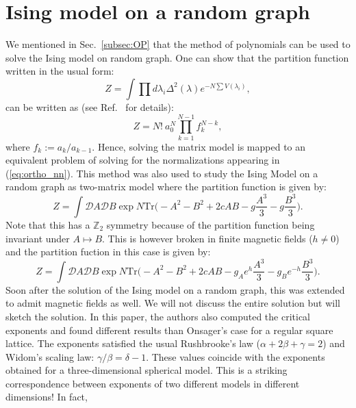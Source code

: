 \documentclass[letter,11pt]{article}
\begin{document}
\section{\label{sec:Ortho_pol1}Ising model on a random graph}
We mentioned in Sec.~\ref{subsec:OP} that the method of polynomials can be used to solve the Ising model on random graph. 
One can show that the partition function written in the usual form: 
\begin{equation}
	Z = \int \prod d\lambda_{i} \Delta^2(\lambda)  e^{-N \sum V(\lambda_i)}, 
\end{equation}
can be written as (see Ref.~\cite{DiFrancesco:1993cyw} for details): 
\begin{equation}
\label{eq:ZOP} 
	Z = N! ~ a_{0}^{N} \prod_{k=1}^{N-1} f_{k}^{N-k},
\end{equation}
where $f_{k} := a_{k}/a_{k-1}$. Hence, solving the matrix model is mapped to an 
equivalent problem of solving for the 
normalizations appearing in (\ref{eq:ortho_nn}). This method was also used to study the 
Ising Model on a random graph as two-matrix model 
\cite{Kazakov:1986hu} where the partition function is given by:
\begin{equation}
	\label{eq:Kaz1} 
	Z = \int \mathcal{D}A \mathcal{D}B \exp N \mbox{Tr} \Bigg(-A^2 -B^2 + 2c AB -g \frac{A^3}{3} - g\frac{B^3}{3}  \Bigg). 
\end{equation}
Note that this has a $\mathbb{Z}_{2}$ symmetry because of 
the partition function being invariant under $A \mapsto B$. This is however broken in finite magnetic fields ($h \neq 0$) and the partition fuction in this case is given by:
\begin{equation}
	\label{eq:RIsing1} 
	Z = \int \mathcal{D}A \mathcal{D}B \exp N \mbox{Tr} \Bigg(-A^2 -B^2 + 2c AB -g_{A}e^{h} \frac{A^3}{3} 
	- g_{B}e^{-h} \frac{B^3}{3}  \Bigg). 
\end{equation}
Soon after the solution of the Ising model on a random graph, this was extended to admit magnetic fields
\cite{Boulatov:1986sb} as well. We will not discuss the entire solution but will 
sketch the solution. In this paper, the authors also computed the critical exponents 
and found different results than Onsager's case for a regular square lattice. 
The exponents satisfied the usual Rushbrooke's law ($\alpha + 2\beta+\gamma=2$) 
and Widom's scaling law: $\gamma/\beta = \delta -1$. 
These values coincide with the exponents obtained for a three-dimensional spherical model. 
This is a striking correspondence between exponents of two different models in different dimensions! In fact, 
\end{document}
